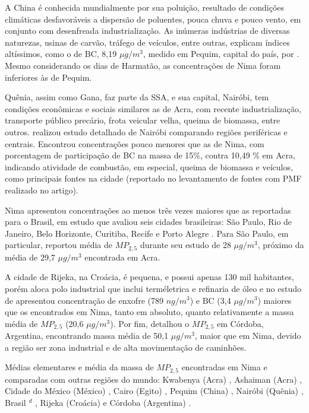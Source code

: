 A China é conhecida mundialmente por sua poluição, resultado de condições
climáticas desfavoráveis a dispersão de poluentes, pouca chuva e pouco vento, 
em conjunto com desenfreada industrialização. As inúmeras indústrias
de diversas naturezas, usinas de carvão, tráfego de veículos, entre outras, 
explicam índices altíssimos, como o de BC, 8,19 $\mu g/m^3$, 
medido em Pequim, capital do país, por \citet{yang2011}. Mesmo considerando 
os dias de Harmatão, as concentrações de Nima foram inferiores às de Pequim.

Quênia, assim como Gana, faz parte da SSA, e sua capital, Nairóbi, tem condições
econômicas e sociais similares as de Acra, com recente industrialização, 
transporte público precário, frota veicular velha, queima de biomassa, 
entre outros.  
\citet{gaita2014} realizou estudo detalhado de Nairóbi comparando regiões 
periféricas e centrais. Encontrou concentrações pouco menores que as de Nima, 
com porcentagem de participação de BC na massa de 15\%, contra 10,49 \% em Acra,
indicando atividade de combustão, em especial, queima de biomassa e veículos, 
como principais fontes na cidade 
(reportado no levantamento de fontes com PMF realizado no artigo). 

Nima apresentou concentrações ao menos três vezes maiores que as reportadas 
para o Brasil, em estudo que avaliou seis cidades brasileiras: São Paulo, 
Rio de Janeiro, Belo Horizonte, Curitiba, Recife e Porto Alegre
\citep{andrade2012urban}. Para São Paulo, em particular, \citet{andrade2012}
reportou média de $MP_{2,5}$ durante seu estudo de 28 $\mu g / m^3$, 
próximo da média de 29,7 $\mu g / m^3$ encontrada em Acra. 

A cidade de Rijeka, na Croácia, é pequena, e possui apenas 130 mil habitantes, 
porém aloca polo industrial que inclui terméletrica e refinaria de óleo
e no estudo de \citep{ivovsevic2015} apresentou concentração de enxofre
(789 $ng / m^3$) e BC (3,4 $\mu g / m^3$) maiores que os encontrados em Nima, 
tanto em absoluto, quanto relativamente a massa média de $MP_{2,5}$ 
(20,6 $\mu g / m^3$). 
Por fim, \citet{achad2014} detalhou o $MP_{2,5}$ em Córdoba, Argentina, 
encontrando massa média de 50,1 $\mu g / m^3$, maior que em Nima, devido a 
região ser zona industrial e de alta movimentação de caminhões.   

\begin{landscape}
  \begin{table}[H]
    \centering
    
    \caption{Médias elementares e média da massa de $MP_{2,5}$ encontradas
             em Nima e comparadas com outras regiões do mundo:
             Kwabenya (Acra) \citep{aboh2009},
             Ashaiman (Acra) \citep{ofosu2012},
             Cidade do México (México) \citep{diaz2014},
             Cairo (Egito) \citep{boman2013},
             Pequim (China) \citep{yang2011},
             Nairóbi (Quênia)  \citep{gaita2014},
             Brasil $^d$ \citep{andrade2012urban},
             Rijeka (Croácia) \citep{ivovsevic2015} e
             Córdoba (Argentina) \citep{achad2014}.
             \label{table:fino_in_the_world}}
  \end{table} 
\end{landscape}

